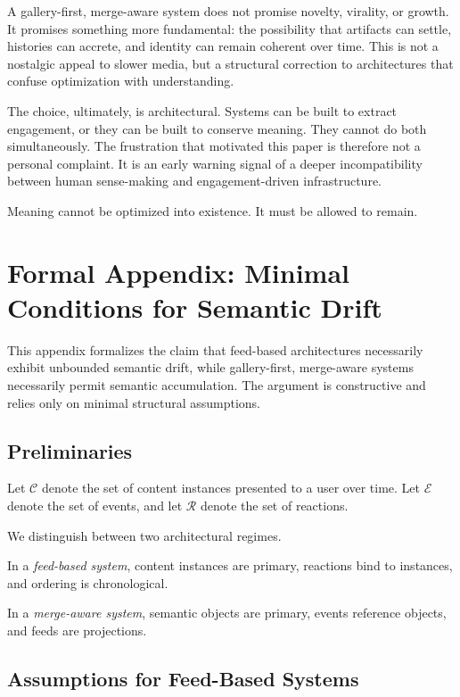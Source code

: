 \documentclass[11pt,oneside]{article}
\begin{document}
A gallery-first, merge-aware system does not promise novelty, virality, or growth. It promises something more fundamental: the possibility that artifacts can settle, histories can accrete, and identity can remain coherent over time. This is not a nostalgic appeal to slower media, but a structural correction to architectures that confuse optimization with understanding.

The choice, ultimately, is architectural. Systems can be built to extract engagement, or they can be built to conserve meaning. They cannot do both simultaneously. The frustration that motivated this paper is therefore not a personal complaint. It is an early warning signal of a deeper incompatibility between human sense-making and engagement-driven infrastructure.

Meaning cannot be optimized into existence. It must be allowed to remain.

\newpage
\appendix
\section{Formal Appendix: Minimal Conditions for Semantic Drift}

This appendix formalizes the claim that feed-based architectures necessarily exhibit unbounded semantic drift, while gallery-first, merge-aware systems necessarily permit semantic accumulation. The argument is constructive and relies only on minimal structural assumptions.

\subsection{Preliminaries}

Let $\mathcal{C}$ denote the set of content instances presented to a user over time. Let $\mathcal{E}$ denote the set of events, and let $\mathcal{R}$ denote the set of reactions.

We distinguish between two architectural regimes.

In a \emph{feed-based system}, content instances are primary, reactions bind to instances, and ordering is chronological.

In a \emph{merge-aware system}, semantic objects are primary, events reference objects, and feeds are projections.

\subsection{Assumptions for Feed-Based Systems}
\end{document}
